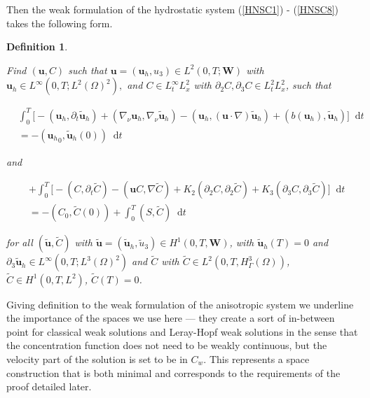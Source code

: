 \documentclass[11pt]{article}
\newtheorem{definition}{Definition}
\newcommand*\diff{\mathop{}\!\mathrm{d}}
\begin{document}
  Then the weak formulation of the hydrostatic system (\ref{HNSC1}) - (\ref{HNSC8}) takes the following form.
  
  \begin{definition} \label{definitionhydrostaticWF}
  
  Find $(\mathbf{u}, C)$ such that $\mathbf{u} = (\mathbf{u}_h, u_3) \in L^2 (0, T; \mathbf{W})$ with $\mathbf{u}_h \in L^\infty (0,T; L^2(\Omega)^2),$ and $C \in L_t^\infty L_x^2$ with $\partial_2 C, \partial_3 C \in L^2_t L^2_x$, such that
  
  \begin{equation}
    \begin{split}
      & \int_0^T \bigg[ -(\mathbf{u}_h, \partial_t \mathbf{\tilde{u}}_h) + (\nabla_\nu \mathbf{u}_h, \nabla_\nu \mathbf{\tilde{u}}_h) - (\mathbf{u}_h, (\mathbf{u} \cdot \nabla) \mathbf{\tilde{u}}_h) + (b(\mathbf{u}_h), \mathbf{\tilde{u}}_h) \bigg ] \diff t \\
      & = - ({\mathbf{u}_h}_0, \mathbf{\tilde{u}}_h(0)) \diff t \label{hydrostaticWF}
    \end{split}
  \end{equation}
  
  and
  
  \begin{equation}
    \begin{split} \nonumber
      &+ \int_0^T \bigg[ -(C, \partial_t \tilde{C}) -(\mathbf{u}C, \nabla \tilde{C}) + K_2 (\partial_2 C, \partial_2 \tilde{C}) + K_3 (\partial_3 C, \partial_3 \tilde{C}) \bigg ] \diff t \\
      & = - (C_0, \tilde{C}(0)) + \int_0^T (S,\tilde{C}) \diff t
    \end{split}
  \end{equation}
  
  for all $(\mathbf{\tilde{u}}, \tilde{C})$ with $\mathbf{\tilde{u}} = (\mathbf{\tilde{u}}_h, \tilde{u}_3) \in H^1 (0,T, \mathbf{W})$, with $\mathbf{\tilde{u}}_h (T) = 0$ and $\partial_3 \mathbf{\tilde{u}}_h \in L^\infty (0, T; L^3 (\Omega)^2)$ and $\tilde{C}$ with $\tilde{C} \in L^2 (0,T, H^3_{\Gamma} (\Omega))$, $\tilde{C} \in H^1 (0,T, L^2)$, $\tilde{C} (T) = 0$. 
  
  \end{definition}
  
  Giving definition to the weak formulation of the anisotropic system we underline the importance of the spaces we use here --- they create a sort of in-between point for classical weak solutions and Leray-Hopf weak solutions in the sense that the concentration function does not need to be weakly continuous, but the velocity part of the solution is set to be in $C_w.$ This represents a space construction that is both minimal and corresponds to the requirements of the proof detailed later.
\end{document}
